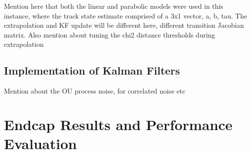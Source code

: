 Mention here that both the linear and parabolic models were used in this instance, where the track state estimate comprised of a 3x1 vector, a, b, tau. The extrapolation and KF update will be different here, different transition Jacobian matrix. Also mention about tuning the chi2 distance thresholds during extrapolation



\subsection{Implementation of Kalman Filters}
\label{gnn-kf-implementation}
Mention about the OU process noise, for correlated noise etc




\section{Endcap Results and Performance Evaluation}



